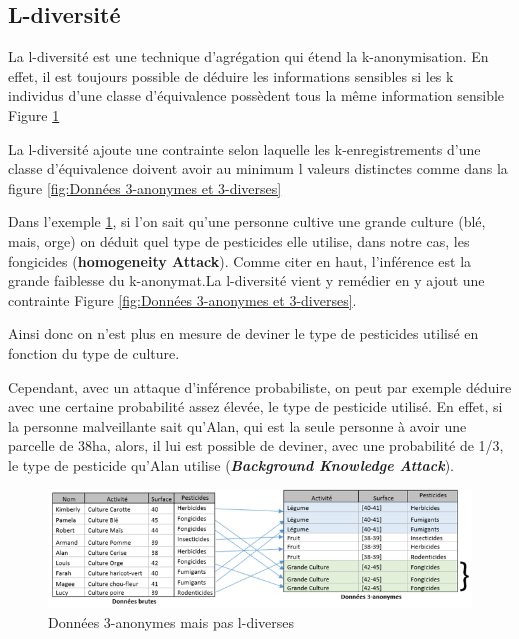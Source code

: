 \subsection{L-diversité}

La l-diversité est une technique d’agrégation qui étend la k-anonymisation. En effet, il est toujours possible de déduire les informations sensibles si les k individus d’une classe d’équivalence possèdent tous la même information sensible Figure \ref{fig:Données 3-anonymes mais pas l-diverses}

La l-diversité ajoute une contrainte selon laquelle les k-enregistrements d’une classe d’équivalence doivent avoir au minimum l valeurs distinctes comme dans la figure \ref{fig:Données 3-anonymes et 3-diverses}


Dans l’exemple \ref{fig:Données 3-anonymes mais pas l-diverses}, si l’on sait qu’une personne cultive une grande culture (blé, mais, orge) on déduit quel type de pesticides elle utilise, dans notre cas, les fongicides (\textbf{\textbf{homogeneity Attack}}).  Comme citer en haut, l’inférence est la grande faiblesse du k-anonymat.La l-diversité vient y remédier en y ajout une contrainte Figure \ref{fig:Données 3-anonymes et 3-diverses}. 

Ainsi donc on n’est plus en mesure de deviner le type de pesticides utilisé en fonction du type de culture.  

Cependant, avec un attaque d’inférence probabiliste, on peut par exemple déduire avec une certaine probabilité assez élevée, le type de pesticide utilisé. En effet, si la personne malveillante sait qu’Alan, qui est la seule personne à avoir une parcelle de 38ha, alors, il lui est possible de deviner, avec une probabilité de 1/3, le type de pesticide qu’Alan utilise (\textit{\textbf{Background Knowledge Attack}}). 
\begin{figure}[!h]
    \centering
      \includegraphics[width=1\textwidth]{images/anonymisation/l_divers_image1.png}
    \caption{ Données 3-anonymes mais pas l-diverses}
     \label{fig:Données 3-anonymes mais pas l-diverses}
   
\end{figure}


